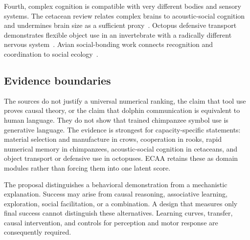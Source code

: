 \documentclass[conference]{IEEEtran}
\begin{document}
Fourth, complex cognition is compatible with very different bodies and sensory systems. The cetacean review relates complex brains to acoustic-social cognition and undermines brain size as a sufficient proxy~\cite{marino2007}. Octopus defensive transport demonstrates flexible object use in an invertebrate with a radically different nervous system~\cite{finn2009}. Avian social-bonding work connects recognition and coordination to social ecology~\cite{emery2007}.

\subsection{Evidence boundaries}
The sources do not justify a universal numerical ranking, the claim that tool use proves causal theory, or the claim that dolphin communication is equivalent to human language. They do not show that trained chimpanzee symbol use is generative language. The evidence is strongest for capacity-specific statements: material selection and manufacture in crows, cooperation in rooks, rapid numerical memory in chimpanzees, acoustic-social cognition in cetaceans, and object transport or defensive use in octopuses. ECAA retains these as domain modules rather than forcing them into one latent score.

The proposal distinguishes a behavioral demonstration from a mechanistic explanation. Success may arise from causal reasoning, associative learning, exploration, social facilitation, or a combination. A design that measures only final success cannot distinguish these alternatives. Learning curves, transfer, causal intervention, and controls for perception and motor response are consequently required.
\end{document}
